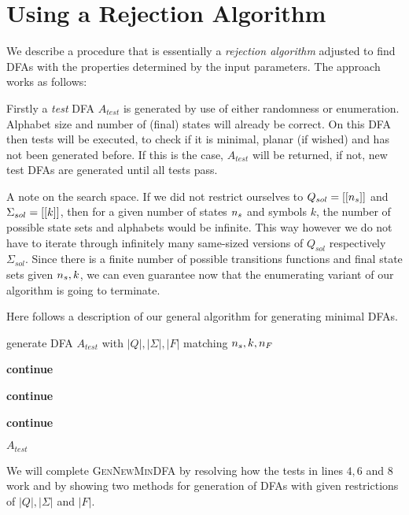 \section{Using a Rejection Algorithm}

We describe a procedure that is essentially a \emph{rejection algorithm} adjusted to find DFAs with the properties determined by the input parameters. The approach works as follows:

Firstly a \emph{test} DFA $A_{test}$ is generated by use of either randomness or enumeration. Alphabet size and number of (final) states will already be correct. On this DFA then tests will be executed, to check if it is minimal, planar (if wished) and has not been generated before. If this is the case, $A_{test}$ will be returned, if not, new test DFAs are generated until all tests pass.

A note on the search space. If we did not restrict ourselves to $Q_{sol} = [[{n_s}]]$ and $\Sigma_{sol} = [[k]]$, then for a given number of states ${n_s}$ and symbols $k$, the number of possible state sets and alphabets would be infinite. This way however we do not have to iterate through infinitely many same-sized versions of $Q_{sol}$ respectively $\Sigma_{sol}$. Since there is a finite number of possible transitions functions and final state sets given ${n_s}, k$, we can even guarantee now that the enumerating variant of our algorithm is going to terminate.

Here follows a description of our general algorithm for generating minimal DFAs.
\vspace{0.2cm}
\begin{algorithmic}[1]
		
			\vspace{0.2cm}
		
			\State generate DFA $A_{test}$ with $|Q|, |\Sigma|, |F|$ matching ${n_s}, k, {n_F}$
			
			\vspace{0.2cm}
			
				\State \textbf{continue}
			\EndIf
			
				\State \textbf{continue}
			\EndIf
			
				\State \textbf{continue}
			\EndIf
			
			\vspace{0.2cm}
			
			\State\Return $A_{test}$
		\EndWhile
	\EndFunction
\end{algorithmic}
\vspace{0.2cm}
We will complete \textsc{GenNewMinDFA} by resolving how the tests in lines $4, 6$ and $8$ work and by showing two methods for generation of DFAs with given restrictions of $|Q|, |\Sigma|$ and $|F|$.

